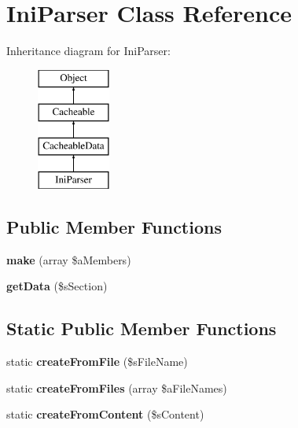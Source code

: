 \hypertarget{class_ini_parser}{\section{Ini\-Parser Class Reference}
\label{class_ini_parser}
}
Inheritance diagram for Ini\-Parser\-:\begin{figure}[H]
\begin{center}
\leavevmode
\includegraphics[height=4.000000cm]{class_ini_parser}
\end{center}
\end{figure}
\subsection*{Public Member Functions}
\begin{DoxyCompactItemize}
\item 
\hypertarget{class_ini_parser_ae07b4b6a20fd6eb5d2bd19a5553c4e6b}{{\bfseries make} (array \$a\-Members)}\label{class_ini_parser_ae07b4b6a20fd6eb5d2bd19a5553c4e6b}

\item 
\hypertarget{class_ini_parser_abc3417f800ee7a1b96c1e7dab25ab28d}{{\bfseries get\-Data} (\$s\-Section)}\label{class_ini_parser_abc3417f800ee7a1b96c1e7dab25ab28d}

\end{DoxyCompactItemize}
\subsection*{Static Public Member Functions}
\begin{DoxyCompactItemize}
\item 
\hypertarget{class_ini_parser_ad870801f067eea5bbe0714cc8a4bc0a3}{static {\bfseries create\-From\-File} (\$s\-File\-Name)}\label{class_ini_parser_ad870801f067eea5bbe0714cc8a4bc0a3}

\item 
\hypertarget{class_ini_parser_a05c2b1619a630fece1d82ada94bda4c6}{static {\bfseries create\-From\-Files} (array \$a\-File\-Names)}\label{class_ini_parser_a05c2b1619a630fece1d82ada94bda4c6}

\item 
\hypertarget{class_ini_parser_aceddeeb47a5be15e7fbd164fa4a0a5a2}{static {\bfseries create\-From\-Content} (\$s\-Content)}\label{class_ini_parser_aceddeeb47a5be15e7fbd164fa4a0a5a2}

\end{DoxyCompactItemize}
